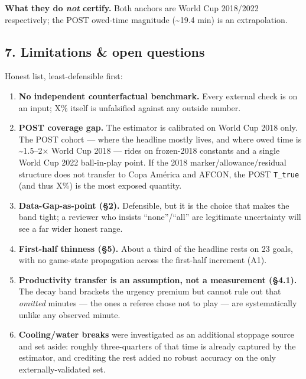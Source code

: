 \documentclass[
]{article}
\providecommand{\tightlist}{%
  \setlength{\itemsep}{0pt}\setlength{\parskip}{0pt}}
\begin{document}
\textbf{What they do \emph{not} certify.} Both anchors are World Cup
2018/2022 respectively; the POST owed-time magnitude
(\textasciitilde19.4 min) is an extrapolation.

\subsection{7. Limitations \& open
questions}\label{limitations-open-questions}

Honest list, least-defensible first:

\begin{enumerate}
\def\labelenumi{\arabic{enumi}.}
\tightlist
\item
  \textbf{No independent counterfactual benchmark.} Every external check
  is on an input; X\% itself is unfalsified against any outside number.
\item
  \textbf{POST coverage gap.} The estimator is calibrated on World Cup
  2018 only. The POST cohort --- where the headline mostly lives, and
  where owed time is \textasciitilde1.5--2× World Cup 2018 --- rides on
  frozen-2018 constants and a single World Cup 2022 ball-in-play point.
  If the 2018 marker/allowance/residual structure does not transfer to
  Copa América and AFCON, the POST \texttt{T\_true} (and thus X\%) is
  the most exposed quantity.
\item
  \textbf{Data-Gap-as-point (§2).} Defensible, but it is the choice that
  makes the band tight; a reviewer who insists ``none''/``all'' are
  legitimate uncertainty will see a far wider honest range.
\item
  \textbf{First-half thinness (§5).} About a third of the headline rests
  on 23 goals, with no game-state propagation across the first-half
  increment (A1).
\item
  \textbf{Productivity transfer is an assumption, not a measurement
  (§4.1).} The decay band brackets the urgency premium but cannot rule
  out that \emph{omitted} minutes --- the ones a referee chose not to
  play --- are systematically unlike any observed minute.
\item
  \textbf{Cooling/water breaks} were investigated as an additional
  stoppage source and set aside: roughly three-quarters of that time is
  already captured by the estimator, and crediting the rest added no
  robust accuracy on the only externally-validated set.
\end{enumerate}
\end{document}
